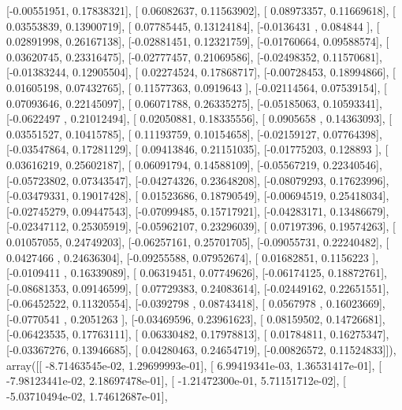 \documentclass{article}
\begin{document}
       [-0.00551951,  0.17838321],
       [ 0.06082637,  0.11563902],
       [ 0.08973357,  0.11669618],
       [ 0.03553839,  0.13900719],
       [ 0.07785445,  0.13124184],
       [-0.0136431 ,  0.084844  ],
       [ 0.02891998,  0.26167138],
       [-0.02881451,  0.12321759],
       [-0.01760664,  0.09588574],
       [ 0.03620745,  0.23316475],
       [-0.02777457,  0.21069586],
       [-0.02498352,  0.11570681],
       [-0.01383244,  0.12905504],
       [ 0.02274524,  0.17868717],
       [-0.00728453,  0.18994866],
       [ 0.01605198,  0.07432765],
       [ 0.11577363,  0.0919643 ],
       [-0.02114564,  0.07539154],
       [ 0.07093646,  0.22145097],
       [ 0.06071788,  0.26335275],
       [-0.05185063,  0.10593341],
       [-0.0622497 ,  0.21012494],
       [ 0.02050881,  0.18335556],
       [ 0.0905658 ,  0.14363093],
       [ 0.03551527,  0.10415785],
       [ 0.11193759,  0.10154658],
       [-0.02159127,  0.07764398],
       [-0.03547864,  0.17281129],
       [ 0.09413846,  0.21151035],
       [-0.01775203,  0.128893  ],
       [ 0.03616219,  0.25602187],
       [ 0.06091794,  0.14588109],
       [-0.05567219,  0.22340546],
       [-0.05723802,  0.07343547],
       [-0.04274326,  0.23648208],
       [-0.08079293,  0.17623996],
       [-0.03479331,  0.19017428],
       [ 0.01523686,  0.18790549],
       [-0.00694519,  0.25418034],
       [-0.02745279,  0.09447543],
       [-0.07099485,  0.15717921],
       [-0.04283171,  0.13486679],
       [-0.02347112,  0.25305919],
       [-0.05962107,  0.23296039],
       [ 0.07197396,  0.19574263],
       [ 0.01057055,  0.24749203],
       [-0.06257161,  0.25701705],
       [-0.09055731,  0.22240482],
       [ 0.0427466 ,  0.24636304],
       [-0.09255588,  0.07952674],
       [ 0.01682851,  0.1156223 ],
       [-0.0109411 ,  0.16339089],
       [ 0.06319451,  0.07749626],
       [-0.06174125,  0.18872761],
       [-0.08681353,  0.09146599],
       [ 0.07729383,  0.24083614],
       [-0.02449162,  0.22651551],
       [-0.06452522,  0.11320554],
       [-0.0392798 ,  0.08743418],
       [ 0.0567978 ,  0.16023669],
       [-0.0770541 ,  0.2051263 ],
       [-0.03469596,  0.23961623],
       [ 0.08159502,  0.14726681],
       [-0.06423535,  0.17763111],
       [ 0.06330482,  0.17978813],
       [ 0.01784811,  0.16275347],
       [-0.03367276,  0.13946685],
       [ 0.04280463,  0.24654719],
       [-0.00826572,  0.11524833]]), array([[ -8.71463545e-02,   1.29699993e-01],
       [  6.99419341e-03,   1.36531417e-01],
       [ -7.98123441e-02,   2.18697478e-01],
       [ -1.21472300e-01,   5.71151712e-02],
       [ -5.03710494e-02,   1.74612687e-01],
\end{document}
